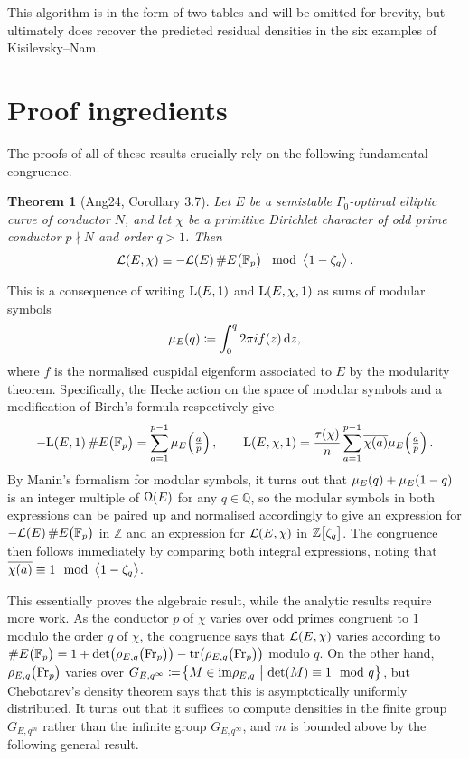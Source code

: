 \documentclass{article}
\theoremstyle{plain}
\newtheorem*{theorem}{Theorem}
\theoremstyle{definition}
\renewcommand{\d}{\mathrm{d}}
\newcommand{\FF}{\mathbb{F}}
\newcommand{\Fr}{\mathrm{Fr}}
\newcommand{\im}{\mathrm{im}}
\renewcommand{\L}{\mathrm{L}}
\newcommand{\LLL}{\mathcal{L}}
\newcommand{\QQ}{\mathbb{Q}}
\newcommand{\tr}{\mathrm{tr}}
\newcommand{\ZZ}{\mathbb{Z}}
\newcommand{\abr}[2][-1]{\ensuremath{\mathinner{\ifthenelse{\equal{#1}{-1}}{\left\langle#2\right\rangle}{}\ifthenelse{\equal{#1}{1}}{\bigl\langle#2\bigr\rangle}{}}}}
\newcommand{\br}{\!\del}
\newcommand{\st}{\ \middle| \ }
\begin{document}
This algorithm is in the form of two tables and will be omitted for brevity, but ultimately does recover the predicted residual densities in the six examples of Kisilevsky--Nam.

\pagebreak

\section{Proof ingredients}

The proofs of all of these results crucially rely on the following fundamental congruence.

\begin{theorem}[Ang24, Corollary 3.7]
Let $ E $ be a semistable $ \Gamma_0 $-optimal elliptic curve of conductor $ N $, and let $ \chi $ be a primitive Dirichlet character of odd prime conductor $ p \nmid N $ and order $ q > 1 $. Then
$$ \LLL\br{E, \chi} \equiv -\LLL\br{E}\#E\br{\FF_p} \mod \abr{1 - \zeta_q}. $$
\end{theorem}

This is a consequence of writing $ \L\br{E, 1} $ and $ \L\br{E, \chi, 1} $ as sums of modular symbols
$$ \mu_E\br{q} \coloneqq \int_0^q 2\pi if\br{z}\d z, $$
where $ f $ is the normalised cuspidal eigenform associated to $ E $ by the modularity theorem. Specifically, the Hecke action on the space of modular symbols and a modification of Birch's formula respectively give
$$ -\L\br{E, 1}\#E\br{\FF_p} = \sum_{a = 1}^{p - 1} \mu_E\br{\tfrac{a}{p}}, \qquad \L\br{E, \chi, 1} = \dfrac{\tau\br{\chi}}{n}\sum_{a = 1}^{p - 1} \overline{\chi\br{a}}\mu_E\br{\tfrac{a}{p}}. $$
By Manin's formalism for modular symbols, it turns out that $ \mu_E\br{q} + \mu_E\br{1 - q} $ is an integer multiple of $ \Omega\br{E} $ for any $ q \in \QQ $, so the modular symbols in both expressions can be paired up and normalised accordingly to give an expression for $ -\LLL\br{E}\#E\br{\FF_p} $ in $ \ZZ $ and an expression for $ \LLL\br{E, \chi} $ in $ \ZZ\sbr{\zeta_q} $. The congruence then follows immediately by comparing both integral expressions, noting that $ \overline{\chi\br{a}} \equiv 1 \mod \abr{1 - \zeta_q} $.

This essentially proves the algebraic result, while the analytic results require more work. As the conductor $ p $ of $ \chi $ varies over odd primes congruent to $ 1 $ modulo the order $ q $ of $ \chi $, the congruence says that $ \LLL\br{E, \chi} $ varies according to $ \#E\br{\FF_p} = 1 + \det\br[1]{\rho_{E, q}\br{\Fr_p}} - \tr\br[1]{\rho_{E, q}\br{\Fr_p}} $ modulo $ q $. On the other hand, $ \rho_{E, q}\br{\Fr_p} $ varies over $ G_{E, q^\infty} \coloneqq \cbr{M \in \im\rho_{E, q} \st \det\br{M} \equiv 1 \mod q} $, but Chebotarev's density theorem says that this is asymptotically uniformly distributed. It turns out that it suffices to compute densities in the finite group $ G_{E, q^m} $ rather than the infinite group $ G_{E, q^\infty} $, and $ m $ is bounded above by the following general result.
\end{document}
